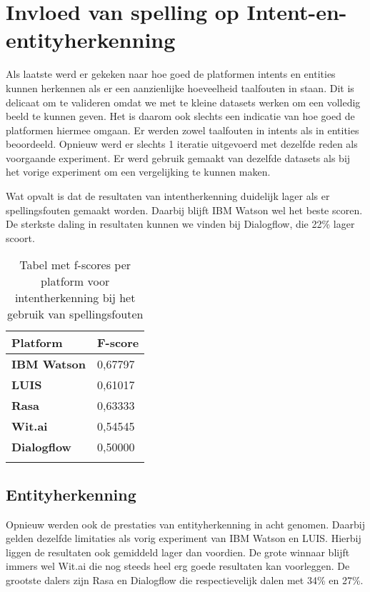 \section{Invloed van spelling op Intent-en-entityherkenning}

Als laatste werd er gekeken naar hoe goed de platformen intents en entities kunnen herkennen als er een aanzienlijke hoeveelheid taalfouten in staan. Dit is delicaat om te valideren omdat we met te kleine datasets werken om een volledig beeld te kunnen geven. Het is daarom ook slechts een indicatie van hoe goed de platformen hiermee omgaan. Er werden zowel taalfouten in intents als in entities beoordeeld. Opnieuw werd er slechts 1 iteratie uitgevoerd met dezelfde reden als voorgaande experiment. Er werd gebruik gemaakt van dezelfde datasets als bij het vorige experiment om een vergelijking te kunnen maken.

Wat opvalt is dat de resultaten van intentherkenning duidelijk lager als er spellingsfouten gemaakt worden. Daarbij blijft IBM Watson wel het beste scoren. De sterkste daling in resultaten kunnen we vinden bij Dialogflow, die 22\% lager scoort.

\begin{center}
    \begin{longtable}{| l | l |}
        \hline
        \textbf{Platform} & \textbf{F-score} \\ \hline
        \textbf{IBM Watson} & 0,67797 \\ \hline  
        \textbf{LUIS} & 0,61017 \\ \hline  
        \textbf{Rasa} & 0,63333 \\ \hline  
        \textbf{Wit.ai} & 0,54545  \\ \hline  
        \textbf{Dialogflow} & 0,50000 \\ \hline  
        \caption{Tabel met f-scores per platform voor intentherkenning bij het gebruik van spellingsfouten}                                    
    \end{longtable}
    \label{tbl:results-intent-spelling}
\end{center}

\subsection{Entityherkenning}

Opnieuw werden ook de prestaties van entityherkenning in acht genomen. Daarbij gelden dezelfde limitaties als vorig experiment van IBM Watson en LUIS. Hierbij liggen de resultaten ook gemiddeld lager dan voordien. De grote winnaar blijft immers wel Wit.ai die nog steeds heel erg goede resultaten kan voorleggen. De grootste dalers zijn Rasa en Dialogflow die respectievelijk dalen met 34\% en 27\%.

